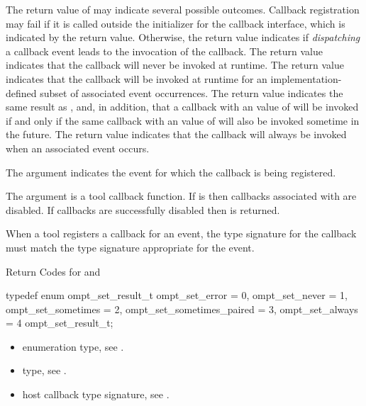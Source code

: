 The return value of  may indicate several possible 
outcomes. Callback registration may fail if it is called outside the initializer 
for the callback interface, which is indicated by the  return 
value. Otherwise, the return value indicates if \emph{dispatching} a callback 
event leads to the invocation of the callback. The  return 
value indicates that the callback will never be invoked at runtime. The 
 return value indicates that the callback will be 
invoked at runtime for an implementation-defined subset of associated event 
occurrences. The  return value indicates the 
same result as , and, in addition, that a callback
with an  value of  will be invoked if 
and only if the same callback with an  value of  
will also be invoked sometime in the future. The  return 
value indicates that the callback will always be invoked when an associated 
event occurs.

\argdesc
The  argument indicates the event for which the callback is 
being registered.

The  argument is a tool callback function. If 
is  then callbacks associated with  are disabled. If
callbacks are successfully disabled then  is returned.

\constraints
When a tool registers a callback for an event, the type signature for the 
callback must match the type signature appropriate for the event.

\begin{table}
\caption{Return Codes for  and
    \label{table:ToolsSupport_set_rc}}
\begin{omptEnum}
typedef enum ompt_set_result_t {
  ompt_set_error            = 0,
  ompt_set_never            = 1,
  ompt_set_sometimes        = 2,
  ompt_set_sometimes_paired = 3,
  ompt_set_always           = 4
} ompt_set_result_t;
\end{omptEnum}
\end{table}

\crossreferences
\begin{itemize}
\item {} enumeration type, see .

\item {} type, see .

\item {} host callback type signature,
see .
\end{itemize}



